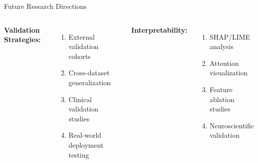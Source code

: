 \documentclass[aspectratio=169]{beamer}
\begin{document}
\begin{frame}{Future Research Directions}
\begin{columns}[T]
\vspace{3mm}

\textbf{Validation Strategies:}
\begin{enumerate}
    \item External validation cohorts
    \item Cross-dataset generalization
    \item Clinical validation studies
    \item Real-world deployment testing
\end{enumerate}

\vspace{3mm}

\textbf{Interpretability:}
\begin{enumerate}
    \item SHAP/LIME analysis
    \item Attention visualization
    \item Feature ablation studies
    \item Neuroscientific validation
\end{enumerate}
\end{columns}
\end{frame}
\end{document}
